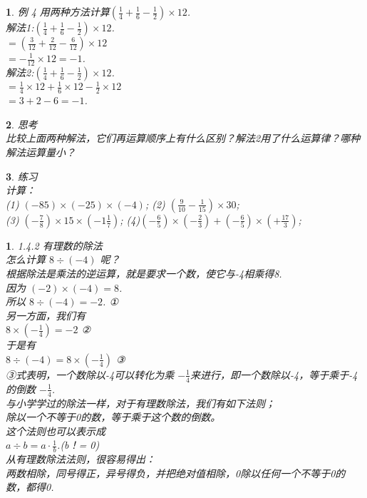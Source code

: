 \documentclass[11pt]{article}
\newtheorem{exercise}{ }
\newtheorem{article}{ }
\begin{document}
\begin{exercise}
例 4 用两种方法计算$ (\frac{1}{4} + \frac{1}{6} -\frac{1}{2})\times 12 $.\\
解法1:$ (\frac{1}{4} + \frac{1}{6} -\frac{1}{2})\times 12 $.\\
$=(\frac{3}{12} + \frac{2}{12} -\frac{6}{12})\times 12 $\\
$=-\frac{1}{12} \times 12=-1 $.\\
解法2:$ (\frac{1}{4} + \frac{1}{6} -\frac{1}{2})\times 12 $.\\
$ =\frac{1}{4} \times 12 +\frac{1}{6} \times 12 - \frac{1}{2} \times 12 $\\
$ =3+2-6 = -1 $.
\end{exercise}

\begin{exercise}
思考\\
    比较上面两种解法，它们再运算顺序上有什么区别？解法2用了什么运算律？哪种解法运算量小？\\
\end{exercise}

\begin{exercise}
练习\\

计算：\\
(1) $(-85) \times (-25) \times (-4)$;
(2) $ (\frac{9}{10} - \frac{1}{15}) \times 30 $;\\
(3) $ (-\frac{7}{8}) \times 15 \times (-1\frac{1}{7}) $;
(4)$ (-\frac{6}{5}) \times (-\frac{2}{3}) + (-\frac{6}{5}) \times (+\frac{17}{3}) $;\\
\end{exercise}

\begin{article}
1.4.2 有理数的除法 \\
怎么计算 $ 8\div(-4)$ 呢？\\
根据除法是乘法的逆运算，就是要求一个数，使它与-4相乘得8.\\
因为  $ (-2)\times(-4) = 8 $.\\
所以  $ 8\div(-4) = -2$.  ①\\
另一方面，我们有  \\
    $  8\times (-\frac{1}{4})=-2 $ ②\\
于是有 \\
    $ 8 \div (-4) = 8\times (-\frac{1}{4}) $ ③\\
③式表明，一个数除以-4可以转化为乘 $-\frac{1}{4}$来进行，即一个数除以-4，等于乘于-4的倒数 $ -\frac{1}{4}$.\\
    与小学学过的除法一样，对于有理数除法，我们有如下法则；\\
    除以一个不等于0的数，等于乘于这个数的倒数。\\
    这个法则也可以表示成\\
        $ a\div b=a \cdot \frac{1}{b}$.(b！= 0) \\
        从有理数除法法则，很容易得出：\\
        两数相除，同号得正，异号得负，并把绝对值相除，0除以任何一个不等于0的数，都得0.\\
\end{article}
\end{document}
